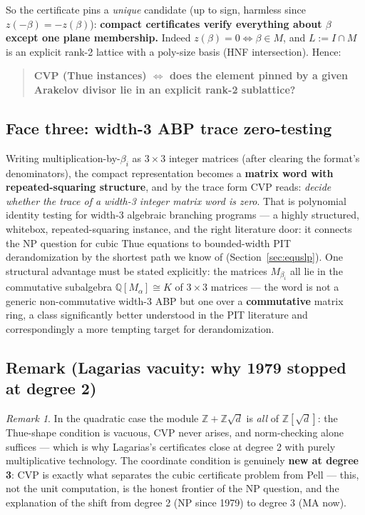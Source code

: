 \documentclass[11pt]{amsart}
\theoremstyle{plain}
\theoremstyle{remark}
\newtheorem{remark}{Remark}[section]
\begin{document}
So the certificate pins a \emph{unique} candidate (up to sign,
harmless since $z(-\beta) = -z(\beta)$): \textbf{compact certificates
verify everything about $\beta$ except one plane membership.} Indeed
$z(\beta) = 0 \iff \beta \in M$, and $L := I \cap M$ is an explicit
rank-2 lattice with a $\mathrm{poly}$-size basis (HNF intersection).
Hence:

\begin{quote}
\textbf{CVP (Thue instances) $\iff$ does the element pinned by a
given Arakelov divisor lie in an explicit rank-2 sublattice?}
\end{quote}

\subsection{Face three: width-3 ABP trace zero-testing}
\label{sec:abpface}

Writing multi\-pli\-ca\-tion-by-$\beta_i$ as $3\times 3$ integer
matrices (after clearing the format's denominators), the compact
representation becomes a \textbf{matrix word with repeated-squaring
structure}, and by the trace form CVP reads: \emph{decide whether the
trace of a width-3 integer matrix word is zero}. That is polynomial
identity testing for width-3 algebraic branching programs --- a
highly structured, whitebox, repeated-squaring instance, and the
right literature door: it connects the NP question for cubic Thue
equations to bounded-width PIT derandomization by the shortest path
we know of (Section~\ref{sec:equslp}). One structural advantage must
be stated explicitly: the matrices $M_{\beta_i}$ all lie in the
commutative subalgebra $\mathbb{Q}[M_\alpha] \cong K$ of $3\times 3$
matrices --- the word is not a generic non-commutative width-3 ABP
but one over a \textbf{commutative} matrix ring, a class
significantly better understood in the PIT literature and
correspondingly a more tempting target for derandomization.

\subsection{Remark (Lagarias vacuity: why 1979 stopped at degree 2)}
\label{sec:vacuity}

\setcounter{remark}{4}%
\begin{remark}\label{rem:vacuity}
In the quadratic case the module $\mathbb{Z} + \mathbb{Z}\sqrt{d}$ is
\emph{all} of $\mathbb{Z}[\sqrt{d}]$: the Thue-shape condition is
vacuous, CVP never arises, and norm-checking alone suffices --- which
is why Lagarias's certificates \cite{Lag79} close at degree 2 with
purely multiplicative technology. The coordinate condition is
genuinely \textbf{new at degree 3}: CVP is exactly what separates the
cubic certificate problem from Pell --- this, not the unit
computation, is the honest frontier of the NP question, and the
explanation of the shift from degree 2 (NP since 1979) to degree 3
(MA now).
\end{remark}
\end{document}
